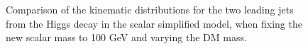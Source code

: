 \begin{figure}[hbpt!]
	\hfill
	\caption{Comparison of the kinematic distributions for the two leading jets from the Higgs decay in the scalar simplified model, 
		when fixing the new scalar mass to 100 GeV and varying the DM mass. 
		\label{fig:ScalarHbb_100}}
\end{figure}

